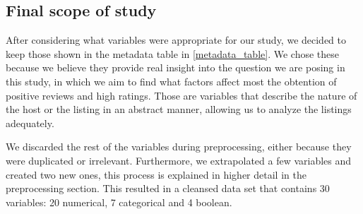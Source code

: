 \subsection{Final scope of study}

After considering what variables were appropriate for our study, we decided to keep
those shown in the metadata table in \cref{metadata_table}. We chose these because
we believe they provide real insight into the question we are posing in this study,
in which we aim to find what factors affect most the obtention of positive reviews
and high ratings. Those are variables that describe the nature of the host or
the listing in an abstract manner, allowing us to analyze the listings adequately.

We discarded the rest
of the variables during preprocessing, either because they were duplicated or
irrelevant. Furthermore, we extrapolated a few variables and created
two new ones, this process is explained in higher detail in the preprocessing
section. This resulted in a cleansed data set that contains 30 variables:
20 numerical, 7 categorical and 4 boolean.
